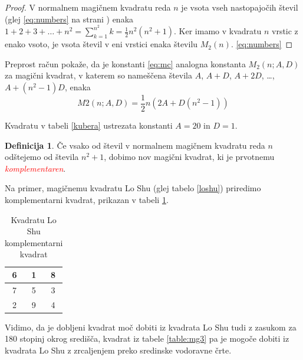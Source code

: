 \documentclass[a4paper,12pt]{article}
\theoremstyle{plain}
\theoremstyle{definition}
\newtheorem{definition}{Definicija}
\begin{document}
\begin{proof}
   V normalnem magičnem kvadratu reda $n$ je vsota vseh nastopajočih
   števil (glej \ref{eq:numbers} na strani \pageref{eq:numbers}) enaka
   $1+2+3+\dots+n^2=\sum_{k=1}^{n^2}k=\frac{1}{2}n^2(n^2+1)$. Ker imamo
   v kvadratu $n$ vrstic z enako vsoto, je vsota števil v eni vrstici
   enaka številu $M_2(n)$. \ref{eq:numbers}
\end{proof}
   

Preprost račun pokaže, da je konstanti \ref{eq:mc} analogna konstanta
$M_2(n;A,D)$ za magični kvadrat, v katerem so nameščena števila
$A$, $A+D$, $A+2D$, \dots, $A+(n^2-1)D$, enaka
\begin{equation}
   \label{2}
   M2(n;A,D) = \frac{1}{2} n \left( 2A + D \left( n^2 - 1 \right) \right)
\end{equation}

Kvadratu v tabeli \ref{kubera} ustrezata konstanti $A=20$ in $D=1$.

\begin{definition}
      Če vsako od števil v normalnem magičnem kvadratu reda $n$ odštejemo
      od števila $n^2+1$, dobimo nov magični kvadrat, ki je prvotnemu
      \textcolor{red}{\emph{komplementaren}}.
\end{definition}

Na primer, magičnemu kvadratu Lo Shu (glej tabelo \ref{loshu}) priredimo
komplementarni kvadrat, prikazan v tabeli \ref{closhu}. \par
%
\begin{table}[h!]
   \centering
   \renewcommand{\arraystretch}{1.2}
   \caption{Kvadratu Lo Shu komplementarni kvadrat}
   \label{closhu}
   \begin{tabular}{|c|c|c|}
      \hline
      6 & 1 & 8 \\\hline
      7 & 5 & 3 \\\hline
      2 & 9 & 4 \\\hline
   \end{tabular}
\end{table} \vspace{1.5em}
Vidimo, da je dobljeni kvadrat moč dobiti iz kvadrata Lo Shu tudi z zasukom za
180 stopinj okrog središča, kvadrat iz tabele \ref{table:mg3} pa je mogoče dobiti
iz kvadrata Lo Shu z zrcaljenjem preko sredinske vodoravne črte.
\end{document}

